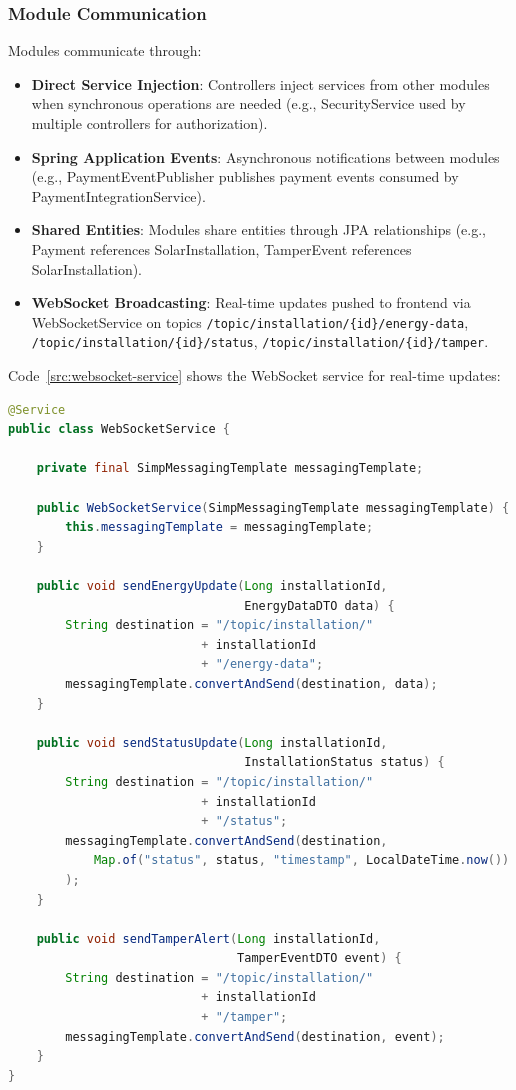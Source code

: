 \subsubsection{Module Communication}
\label{subsubsec:module-communication}

Modules communicate through:
\begin{itemize}
    \item \textbf{Direct Service Injection}: Controllers inject services from other modules when synchronous operations are needed (e.g., SecurityService used by multiple controllers for authorization).
    \item \textbf{Spring Application Events}: Asynchronous notifications between modules (e.g., PaymentEventPublisher publishes payment events consumed by PaymentIntegrationService).
    \item \textbf{Shared Entities}: Modules share entities through JPA relationships (e.g., Payment references SolarInstallation, TamperEvent references SolarInstallation).
    \item \textbf{WebSocket Broadcasting}: Real-time updates pushed to frontend via WebSocketService on topics \texttt{/topic/installation/\{id\}/energy-data}, \texttt{/topic/installation/\{id\}/status}, \texttt{/topic/installation/\{id\}/tamper}.
\end{itemize}

Code~\ref{src:websocket-service} shows the WebSocket service for real-time updates:

\begin{lstlisting}[language=Java]
@Service
public class WebSocketService {
    
    private final SimpMessagingTemplate messagingTemplate;
    
    public WebSocketService(SimpMessagingTemplate messagingTemplate) {
        this.messagingTemplate = messagingTemplate;
    }
    
    public void sendEnergyUpdate(Long installationId, 
                                 EnergyDataDTO data) {
        String destination = "/topic/installation/" 
                           + installationId 
                           + "/energy-data";
        messagingTemplate.convertAndSend(destination, data);
    }
    
    public void sendStatusUpdate(Long installationId, 
                                 InstallationStatus status) {
        String destination = "/topic/installation/" 
                           + installationId 
                           + "/status";
        messagingTemplate.convertAndSend(destination, 
            Map.of("status", status, "timestamp", LocalDateTime.now())
        );
    }
    
    public void sendTamperAlert(Long installationId, 
                                TamperEventDTO event) {
        String destination = "/topic/installation/" 
                           + installationId 
                           + "/tamper";
        messagingTemplate.convertAndSend(destination, event);
    }
}
\end{lstlisting}

